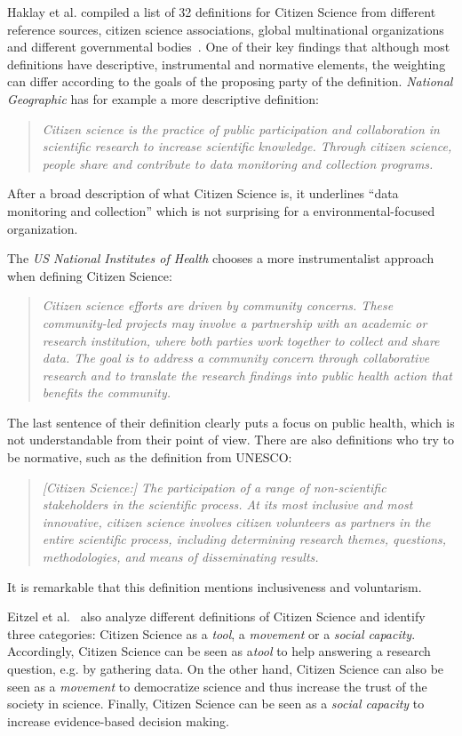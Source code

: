 Haklay et al. compiled a list of 32 definitions for Citizen Science from different reference sources, citizen science associations, global multinational organizations and different governmental bodies~\cite{haklay2021citizen}.
One of their key findings that although most definitions have descriptive, instrumental and normative elements, the weighting can differ according to the goals of the proposing party of the definition.
\textit{National Geographic} has for example a more descriptive definition:
\begin{quote}
\textit{Citizen science is the practice of public participation and collaboration in scientific research to increase scientific knowledge. Through citizen science, people share and contribute to data monitoring and collection programs.}
\end{quote}
After a broad description of what Citizen Science is, it underlines ``data monitoring and collection'' which is not surprising for a environmental-focused organization.

The \textit{US National Institutes of Health} chooses a more instrumentalist approach when defining Citizen Science:
\begin{quote}
\textit{Citizen science efforts are driven by community concerns. These community-led projects may involve a partnership with an academic or research institution, where both parties work together to collect and share data. The goal is to address a community concern through collaborative research and to translate the research findings into public health action that benefits the community.}
\end{quote}
The last sentence of their definition clearly puts a focus on public health, which is not understandable from their point of view.
There are also definitions who try to be normative, such as the definition from UNESCO:
\begin{quote}
\textit{[Citizen Science:] The participation of a range of non-scientific stakeholders in the scientific process. At its most inclusive and most innovative, citizen science involves citizen volunteers as partners in the entire scientific process, including determining research themes, questions, methodologies, and means of disseminating results.}
\end{quote}
It is remarkable that this definition mentions inclusiveness and voluntarism.

Eitzel et al.~\cite{eitzel2017citizen} also analyze different definitions of Citizen Science and identify three categories: Citizen Science as a \textit{tool}, a \textit{movement} or a \textit{social capacity}.
Accordingly, Citizen Science can be seen as a\textit{tool} to help answering a research question, e.g. by gathering data.
On the other hand, Citizen Science can also be seen as a \textit{movement} to democratize science and thus increase the trust of the society in science.
Finally, Citizen Science can be seen as a \textit{social capacity} to increase evidence-based decision making.

